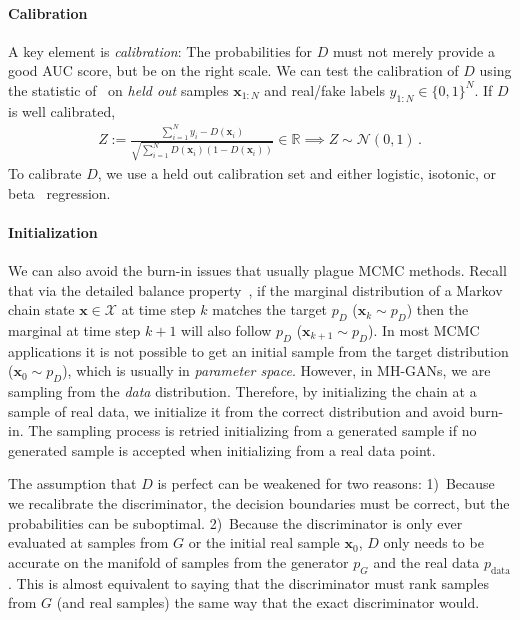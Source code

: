 \documentclass{article}
\renewcommand{\vec}[1]{{\boldsymbol{\mathbf{#1}}}} %
\newcommand{\R}{\mathbb{R}}
\newcommand{\set}[1]{\mathcal{#1}}
\newcommand{\sample}{\sim}
\newcommand{\norm}{\mathcal{N}}
\newcommand{\bern}{\textrm{Bern}}
\newcommand{\PG}{{p_G}}
\newcommand{\PD}{{p_D}}
\newcommand{\PR}{{p_{\textrm{data}}}}
\newcommand{\setx}{\set{X}}
\begin{document}
\paragraph{Calibration}
A key element is \emph{calibration}: The probabilities for $D$ must not merely provide a good AUC score, but be on the right scale.
We can test the calibration of $D$ using the statistic of~\citet{Dawid1997} on \emph{held out} samples $\vec x_{1:N}$ and real/fake labels $y_{1:N} \in \{0,1\}^N$.
If $D$ is well calibrated, %
\begin{align}
  Z := \frac{\sum_{i=1}^N y_i - D(\vec x_i)}{\sqrt{\sum_{i=1}^N D(\vec x_i) (1 - D(\vec x_i))}} \in \R \implies Z \sample \norm(0,1)\,. \label{eq:calib score}
\end{align}
To calibrate $D$, we use a held out calibration set and either logistic, isotonic, or beta~\citep{Kull2017} regression.

\paragraph{Initialization}
We can also avoid the burn-in issues that usually plague MCMC methods.
Recall that via the detailed balance property~\citep[Ch.~1]{Gilks1996}, if the marginal distribution of a Markov chain state $\vec x \in \setx$ at time step $k$ matches the target $\PD$ ($\vec x_k \sample \PD$) then the marginal at time step $k+1$ will also follow $\PD$ ($\vec x_{k+1} \sample \PD$)\@.
In most MCMC applications it is not possible to get an initial sample from the target distribution ($\vec x_0 \sample \PD$), which is usually in \emph{parameter space}.
However, in MH-GANs, we are sampling from the \emph{data} distribution.
Therefore, by initializing the chain at a sample of real data, we initialize it from the correct distribution and avoid burn-in.
The sampling process is retried initializing from a generated sample if no generated sample is accepted when initializing from a real data point.

The assumption that $D$ is perfect can be weakened for two reasons:
1)~Because we recalibrate the discriminator, the decision boundaries must be correct, but the probabilities can be suboptimal.
2)~Because the discriminator is only ever evaluated at samples from $G$ or the initial real sample $\vec x_0$, $D$ only needs to be accurate on the manifold of samples from the generator $\PG$ and the real data $\PR$.
This is almost equivalent to saying that the discriminator must rank samples from $G$ (and real samples) the same way that the exact discriminator would.
\end{document}
